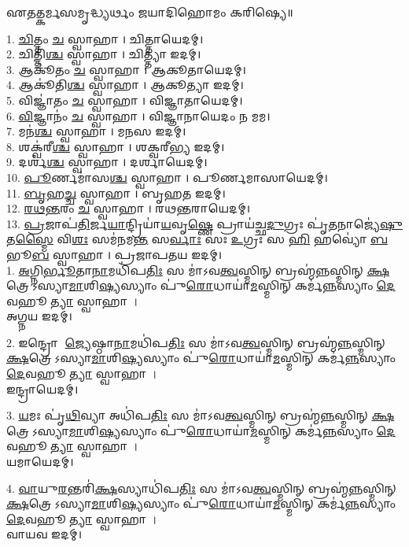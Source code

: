 
𑌏𑌤𑌤𑍍𑌕𑌰𑍍𑌮𑌸𑌮𑍃𑌦𑍍𑌧𑍍𑌯𑌰𑍍𑌥𑌂 𑌜𑌯𑌾𑌦𑌿𑌹𑍋𑌮𑌂 𑌕𑌰𑌿𑌷𑍍𑌯𑍇॥

1. \ul{𑌚𑌿}𑌤𑍍𑌤𑌂 \ul{𑌚} 𑌸𑍍𑌵𑌾𑌹𑌾। 𑌚𑌿𑌤𑍍𑌤𑌾𑌯𑍇𑌦𑌮𑍍।\\
2. 𑌚𑌿𑌤𑍍𑌤𑌿॑\ul{𑌶𑍍𑌚} 𑌸𑍍𑌵𑌾𑌹𑌾। 𑌚𑌿𑌤𑍍𑌤𑍍𑌯𑌾 𑌇𑌦𑌮𑍍।\\
3. 𑌆𑌕𑍂॑𑌤𑌂 \ul{𑌚} 𑌸𑍍𑌵𑌾𑌹𑌾। 𑌆𑌕𑍂𑌤𑌾𑌯𑍇𑌦𑌮𑍍।\\
4. 𑌆𑌕𑍂॑𑌤𑌿\ul{𑌶𑍍𑌚} 𑌸𑍍𑌵𑌾𑌹𑌾। 𑌆𑌕𑍂𑌤𑍍𑌯𑌾 𑌇𑌦𑌮𑍍।\\
5. 𑌵𑌿𑌜𑍍𑌞𑌾॑𑌤𑌂 \ul{𑌚} 𑌸𑍍𑌵𑌾𑌹𑌾। 𑌵𑌿𑌜𑍍𑌞𑌾𑌤𑌾𑌯𑍇𑌦𑌮𑍍।\\
6. \ul{𑌵𑌿}𑌜𑍍𑌞𑌾𑌨𑌂॑ \ul{𑌚} 𑌸𑍍𑌵𑌾𑌹𑌾। 𑌵𑌿𑌜𑍍𑌞𑌾𑌨𑌾𑌯𑍇𑌦𑌂 𑌨 𑌮𑌮।\\
7. 𑌮𑌨॑\ul{𑌶𑍍𑌚} 𑌸𑍍𑌵𑌾𑌹𑌾। 𑌮𑌨𑌸 𑌇𑌦𑌮𑍍।\\
8. 𑌶𑌕𑍍𑌵॑𑌰𑍀\ul{𑌶𑍍𑌚} 𑌸𑍍𑌵𑌾𑌹𑌾। 𑌶𑌕𑍍𑌵𑌰𑍀𑌭𑍍𑌯 𑌇𑌦𑌮𑍍।\\
9. 𑌦𑌰𑍍𑌶॑\ul{𑌶𑍍𑌚} 𑌸𑍍𑌵𑌾𑌹𑌾। 𑌦𑌰𑍍𑌶𑌾𑌯𑍇𑌦𑌮𑍍।\\
10. \ul{𑌪𑍂}𑌰𑍍𑌣𑌮𑌾॑𑌸\ul{𑌶𑍍𑌚} 𑌸𑍍𑌵𑌾𑌹𑌾। 𑌪𑍂𑌰𑍍𑌣𑌮𑌾𑌸𑌾𑌯𑍇𑌦𑌮𑍍।\\
11. \ul{𑌬𑍃}𑌹\ul{𑌚𑍍𑌚} 𑌸𑍍𑌵𑌾𑌹𑌾। 𑌬𑍃𑌹𑌤 𑌇𑌦𑌮𑍍।\\
12. \ul{𑌰}\ul{𑌥}\ul{𑌨𑍍𑌤}𑌰𑌂 \ul{𑌚} 𑌸𑍍𑌵𑌾𑌹𑌾। 𑌰𑌥𑌨𑍍𑌤𑌰𑌾𑌯𑍇𑌦𑌮𑍍।\\
13. \ul{𑌪𑍍𑌰}𑌜𑌾𑌪॑\ul{𑌤𑌿}𑌰𑍍𑌜\ul{𑌯𑌾}𑌨𑍍𑌦𑍍𑌰𑌿𑌯𑌾॑\ul{𑌯}𑌵𑍃\ul{𑌷𑍍𑌣𑍇} 𑌪𑍍𑌰𑌾𑌯॑𑌚𑍍𑌛\ul{𑌦𑍁}𑌗𑍍𑌰𑌃 𑌪𑍃॑\ul{𑌤}𑌨𑌾𑌜𑍍𑌯𑍇॑\ul{𑌷𑍁} 𑌤\ul{𑌸𑍍𑌮𑍈} 𑌵𑌿\ul{𑌶𑌃} 𑌸𑌮॑𑌨𑌮\ul{𑌨𑍍𑌤} 𑌸\ul{𑌰𑍍𑌵𑌾𑌃} 𑌸𑌃 \ul{𑌉}𑌗𑍍𑌰𑌃 𑌸 \ul{𑌹𑌿} 𑌹𑌵𑍍𑌯𑍋॑ \ul{𑌬}𑌭𑍂\ul{𑌬} 𑌸𑍍𑌵𑌾𑌹𑌾। 𑌪𑍍𑌰𑌜𑌾𑌪𑌤𑌯 𑌇𑌦𑌮𑍍।\\

1. \ul{𑌅}𑌗𑍍𑌨𑌿\ul{𑌰𑍍𑌭𑍂}𑌤𑌾\ul{𑌨𑌾}𑌮𑌧𑌿॑𑌪\ul{𑌤𑌿𑌃} 𑌸 𑌮𑌾॑𑌽𑌵\ul{𑌤𑍍𑌵}𑌸𑍍𑌮𑌿𑌨𑍍 𑌬𑍍𑌰𑌹𑍍𑌮॑\ul{𑌨𑍍𑌨}𑌸𑍍𑌮𑌿𑌨𑍍 \ul{𑌕𑍍𑌷}𑌤𑍍𑌰𑍇𑌽𑌸𑍍𑌯𑌾\ul{𑌮𑌾}𑌶𑌿\ul{𑌷𑍍𑌯}𑌸𑍍𑌯𑌾𑌂 𑌪𑍁॑\ul{𑌰𑍋}𑌧𑌾𑌯𑌾॑\ul{𑌮}𑌸𑍍𑌮𑌿𑌨𑍍 𑌕𑌰𑍍𑌮॑\ul{𑌨𑍍𑌨}𑌸𑍍𑌯𑌾𑌂 \ul{𑌦𑍇}𑌵𑌹𑍂\ul{𑌤𑍍𑌯𑌾} 𑌸𑍍𑌵𑌾𑌹𑌾।\\
𑌅𑌗𑍍𑌨𑌯 𑌇𑌦𑌮𑍍।

2. 𑌇𑌨𑍍𑌦𑍍𑌰𑍋 \ul{𑌜𑍍𑌯𑍇}𑌷𑍍𑌠𑌾\ul{𑌨𑌾}𑌮𑌧𑌿॑𑌪\ul{𑌤𑌿𑌃} 𑌸 𑌮𑌾॑𑌽𑌵\ul{𑌤𑍍𑌵}𑌸𑍍𑌮𑌿𑌨𑍍 𑌬𑍍𑌰𑌹𑍍𑌮॑\ul{𑌨𑍍𑌨}𑌸𑍍𑌮𑌿𑌨𑍍 \ul{𑌕𑍍𑌷}𑌤𑍍𑌰𑍇𑌽𑌸𑍍𑌯𑌾\ul{𑌮𑌾}𑌶𑌿\ul{𑌷𑍍𑌯}𑌸𑍍𑌯𑌾𑌂 𑌪𑍁॑\ul{𑌰𑍋}𑌧𑌾𑌯𑌾॑\ul{𑌮}𑌸𑍍𑌮𑌿𑌨𑍍 𑌕𑌰𑍍𑌮॑\ul{𑌨𑍍𑌨}𑌸𑍍𑌯𑌾𑌂 \ul{𑌦𑍇}𑌵𑌹𑍂\ul{𑌤𑍍𑌯𑌾} 𑌸𑍍𑌵𑌾𑌹𑌾।\\
𑌇𑌨𑍍𑌦𑍍𑌰𑌾𑌯𑍇𑌦𑌮𑍍।

3. \ul{𑌯}𑌮𑌃 𑌪𑍃॑\ul{𑌥𑌿}𑌵𑍍𑌯𑌾 𑌅𑌧𑌿॑𑌪\ul{𑌤𑌿𑌃} 𑌸 𑌮𑌾॑𑌽𑌵\ul{𑌤𑍍𑌵}𑌸𑍍𑌮𑌿𑌨𑍍 𑌬𑍍𑌰𑌹𑍍𑌮॑\ul{𑌨𑍍𑌨}𑌸𑍍𑌮𑌿𑌨𑍍 \ul{𑌕𑍍𑌷}𑌤𑍍𑌰𑍇𑌽𑌸𑍍𑌯𑌾\ul{𑌮𑌾}𑌶𑌿\ul{𑌷𑍍𑌯}𑌸𑍍𑌯𑌾𑌂 𑌪𑍁॑\ul{𑌰𑍋}𑌧𑌾𑌯𑌾॑\ul{𑌮}𑌸𑍍𑌮𑌿𑌨𑍍 𑌕𑌰𑍍𑌮॑\ul{𑌨𑍍𑌨}𑌸𑍍𑌯𑌾𑌂 \ul{𑌦𑍇}𑌵𑌹𑍂\ul{𑌤𑍍𑌯𑌾} 𑌸𑍍𑌵𑌾𑌹𑌾।\\
𑌯𑌮𑌾𑌯𑍇𑌦𑌮𑍍।

4. \ul{𑌵𑌾}𑌯𑍁\ul{𑌰}𑌨𑍍𑌤𑌰𑌿॑\ul{𑌕𑍍𑌷}𑌸𑍍𑌯𑌾𑌧𑌿॑𑌪\ul{𑌤𑌿𑌃} 𑌸 𑌮𑌾॑𑌽𑌵\ul{𑌤𑍍𑌵}𑌸𑍍𑌮𑌿𑌨𑍍 𑌬𑍍𑌰𑌹𑍍𑌮॑\ul{𑌨𑍍𑌨}𑌸𑍍𑌮𑌿𑌨𑍍 \ul{𑌕𑍍𑌷}𑌤𑍍𑌰𑍇𑌽𑌸𑍍𑌯𑌾\ul{𑌮𑌾}𑌶𑌿\ul{𑌷𑍍𑌯}𑌸𑍍𑌯𑌾𑌂 𑌪𑍁॑\ul{𑌰𑍋}𑌧𑌾𑌯𑌾॑\ul{𑌮}𑌸𑍍𑌮𑌿𑌨𑍍 𑌕𑌰𑍍𑌮॑\ul{𑌨𑍍𑌨}𑌸𑍍𑌯𑌾𑌂 \ul{𑌦𑍇}𑌵𑌹𑍂\ul{𑌤𑍍𑌯𑌾} 𑌸𑍍𑌵𑌾𑌹𑌾।\\
𑌵𑌾𑌯𑌵 𑌇𑌦𑌮𑍍।

